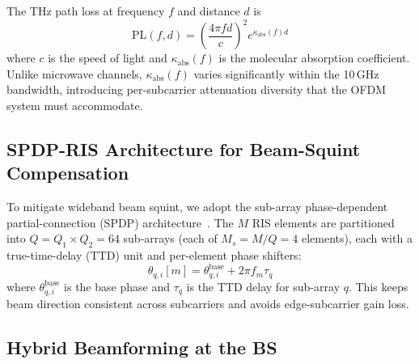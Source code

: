 \documentclass[journal,twocolumn]{IEEEtran}
\begin{document}
The THz path loss at frequency $f$ and distance $d$ is
\begin{equation}
\text{PL}(f, d) = \left(\frac{4\pi f d}{c}\right)^2 e^{\kappa_{\text{abs}}(f) d}
\label{eq:pathloss}
\end{equation}
where $c$ is the speed of light and $\kappa_{\text{abs}}(f)$ is the molecular absorption coefficient. Unlike microwave channels, $\kappa_{\text{abs}}(f)$ varies significantly within the 10\,GHz bandwidth, introducing per-subcarrier attenuation diversity that the OFDM system must accommodate.

\subsection{SPDP-RIS Architecture for Beam-Squint Compensation}

To mitigate wideband beam squint, we adopt the sub-array phase-dependent partial-connection (SPDP) architecture~\cite{su2023wideband}. The $M$ RIS elements are partitioned into $Q = Q_1 \times Q_2 = 64$ sub-arrays (each of $M_s = M/Q = 4$ elements), each with a true-time-delay (TTD) unit and per-element phase shifters:
\begin{equation}
\theta_{q,i}[m] = \theta_{q,i}^{\text{base}} + 2\pi f_m \tau_q
\label{eq:spdp}
\end{equation}
where $\theta_{q,i}^{\text{base}}$ is the base phase and $\tau_q$ is the TTD delay for sub-array $q$. This keeps beam direction consistent across subcarriers and avoids edge-subcarrier gain loss.

\subsection{Hybrid Beamforming at the BS}
\end{document}
